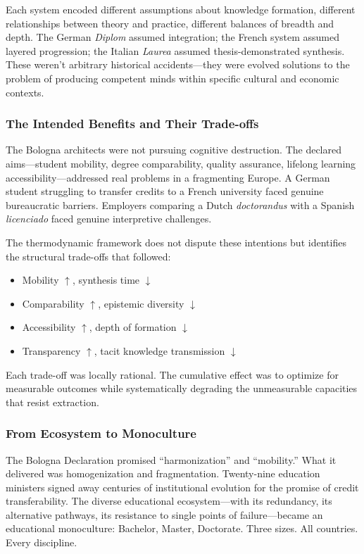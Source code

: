 Each system encoded different assumptions about knowledge formation, different relationships between theory and practice, different balances of breadth and depth. The German \textit{Diplom} assumed integration; the French system assumed layered progression; the Italian \textit{Laurea} assumed thesis-demonstrated synthesis. These weren't arbitrary historical accidents---they were evolved solutions to the problem of producing competent minds within specific cultural and economic contexts.

\subsubsection{The Intended Benefits and Their Trade-offs}

The Bologna architects were not pursuing cognitive destruction. The declared aims---student mobility, degree comparability, quality assurance, lifelong learning accessibility---addressed real problems in a fragmenting Europe. A German student struggling to transfer credits to a French university faced genuine bureaucratic barriers. Employers comparing a Dutch \textit{doctorandus} with a Spanish \textit{licenciado} faced genuine interpretive challenges.

The thermodynamic framework does not dispute these intentions but identifies the structural trade-offs that followed:

\begin{itemize}
    \item Mobility $\uparrow$, synthesis time $\downarrow$
    \item Comparability $\uparrow$, epistemic diversity $\downarrow$
    \item Accessibility $\uparrow$, depth of formation $\downarrow$
    \item Transparency $\uparrow$, tacit knowledge transmission $\downarrow$
\end{itemize}

Each trade-off was locally rational. The cumulative effect was to optimize for measurable outcomes while systematically degrading the unmeasurable capacities that resist extraction.

\subsubsection{From Ecosystem to Monoculture}

The Bologna Declaration promised ``harmonization'' and ``mobility.'' What it delivered was homogenization and fragmentation. Twenty-nine education ministers signed away centuries of institutional evolution for the promise of credit transferability. The diverse educational ecosystem---with its redundancy, its alternative pathways, its resistance to single points of failure---became an educational monoculture: Bachelor, Master, Doctorate. Three sizes. All countries. Every discipline.

